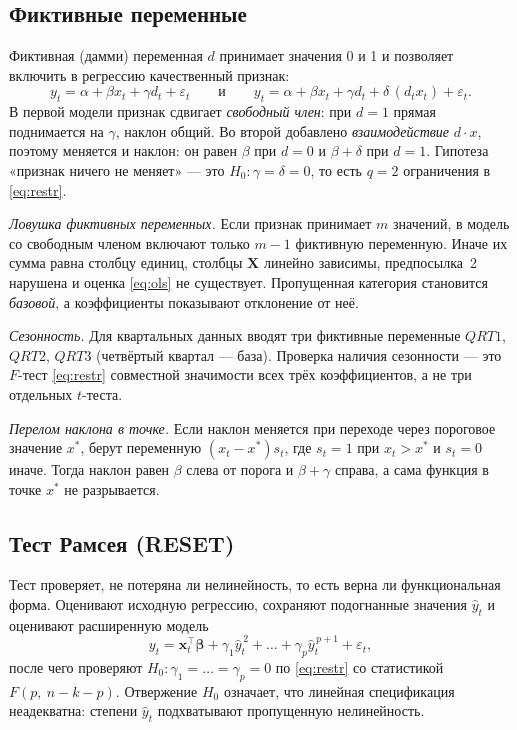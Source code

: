 \subsection{Фиктивные переменные}\label{sec:dummy}

Фиктивная (дамми) переменная $d$ принимает значения 0 и 1 и позволяет включить
в регрессию качественный признак:
\begin{equation}
  y_t = \alpha + \beta x_t + \gamma d_t + \varepsilon_t
  \qquad\text{и}\qquad
  y_t = \alpha + \beta x_t + \gamma d_t + \delta\,(d_tx_t) + \varepsilon_t .
  \label{eq:dummy}
\end{equation}
В первой модели признак сдвигает \emph{свободный член}: при $d = 1$ прямая
поднимается на $\gamma$, наклон общий. Во второй добавлено \emph{взаимодействие}
$d\cdot x$, поэтому меняется и наклон: он равен $\beta$ при $d = 0$ и
$\beta + \delta$ при $d = 1$. Гипотеза «признак ничего не меняет» — это
$H_0\colon \gamma = \delta = 0$, то есть $q = 2$ ограничения в \eqref{eq:restr}.

\emph{Ловушка фиктивных переменных.} Если признак принимает $m$ значений, в
модель со свободным членом включают только $m-1$ фиктивную переменную. Иначе их
сумма равна столбцу единиц, столбцы $\mathbf{X}$ линейно зависимы, предпосылка~2
нарушена и оценка \eqref{eq:ols} не существует. Пропущенная категория
становится \emph{базовой}, а коэффициенты показывают отклонение от неё.

\emph{Сезонность.} Для квартальных данных вводят три фиктивные переменные
$\mathit{QRT}1$, $\mathit{QRT}2$, $\mathit{QRT}3$ (четвёртый квартал — база).
Проверка наличия сезонности — это $F$-тест \eqref{eq:restr} совместной
значимости всех трёх коэффициентов, а не три отдельных $t$-теста.

\emph{Перелом наклона в точке.} Если наклон меняется при переходе через
пороговое значение $x^{*}$, берут переменную $(x_t - x^{*})s_t$, где $s_t = 1$
при $x_t > x^{*}$ и $s_t = 0$ иначе. Тогда наклон равен $\beta$ слева от порога
и $\beta + \gamma$ справа, а сама функция в точке $x^{*}$ не разрывается.

\subsection{Тест Рамсея (RESET)}\label{sec:reset}

Тест проверяет, не потеряна ли нелинейность, то есть верна ли функциональная
форма. Оценивают исходную регрессию, сохраняют подогнанные значения
$\widehat{y}_t$ и оценивают расширенную модель
\begin{equation}
  y_t = \mathbf{x}_t^{\top}\boldsymbol{\beta}
        + \gamma_1\widehat{y}_t^{\,2} + \dots + \gamma_p\widehat{y}_t^{\,p+1}
        + \varepsilon_t ,
  \label{eq:reset}
\end{equation}
после чего проверяют $H_0\colon \gamma_1 = \dots = \gamma_p = 0$ по
\eqref{eq:restr} со статистикой $F(p,\ n-k-p)$. Отвержение $H_0$ означает, что
линейная спецификация неадекватна: степени $\widehat{y}_t$ подхватывают
пропущенную нелинейность.

